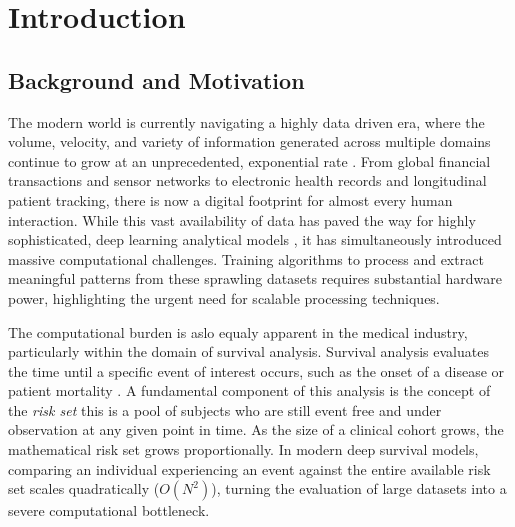 \documentclass[a4paper,twoside,12pt]{report}
\begin{document}

\clearpage
{} %

\chapter{Introduction}
\label{ch:introduction}

\section{Background and Motivation}

The modern world is currently navigating a highly data driven era, where the volume, velocity, and variety of information generated across multiple domains continue to grow at an unprecedented, exponential rate \citep{Laney2001}. From global financial transactions and sensor networks to electronic health records and longitudinal patient tracking, there is now a digital footprint for almost every human interaction. While this vast availability of data has paved the way for highly sophisticated, deep learning analytical models \citep{LeCun2015} , it has simultaneously introduced massive computational challenges. Training algorithms to process and extract meaningful patterns from these sprawling datasets requires substantial hardware power, highlighting the urgent need for scalable processing techniques.

The computational burden is aslo equaly apparent in the medical industry, particularly within the domain of survival analysis. Survival analysis evaluates the time until a specific event of interest occurs, such as the onset of a disease or patient mortality \citep{Cox1972} . A fundamental component of this analysis is the concept of the \textit{risk set} this is a pool of subjects who are still event free and under observation at any given point in time. As the size of a clinical cohort grows, the mathematical risk set grows proportionally. In modern deep survival models, comparing an individual experiencing an event against the entire available risk set scales quadratically ($O(N^2)$), turning the evaluation of large datasets into a severe computational bottleneck.
\end{document}
